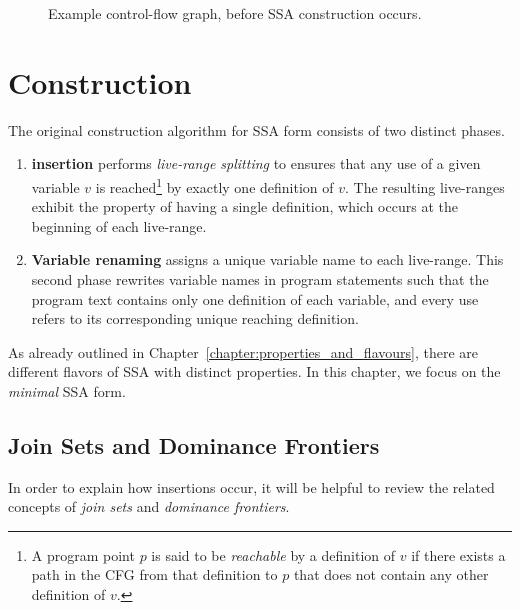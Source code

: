 {\begin{figure}
  \begin{center}
  \end{center}
\caption{\label{fig:classical_construction_algorithm:examplecfg}Example control-flow graph, before
  SSA construction occurs.}
\end{figure}

\section{Construction}
\label{sec:classical_construction}

The original construction algorithm for SSA form consists of two distinct phases.
\begin{enumerate}
\item \textbf{\phifun insertion} performs \textit{live-range splitting} to ensures that any use of a given variable $v$ is reached\footnote{A program point $p$ is said to be \emph{reachable} by a definition of $v$ if there exists a path in the CFG from that definition to $p$ that does not contain any other definition of $v$.} by exactly one definition of $v$. 
  The resulting live-ranges exhibit the property of having a single definition, which occurs at the beginning of each live-range.
\item \textbf{Variable renaming} assigns a unique variable name to each live-range. 
  This second phase rewrites variable names in program statements such that the program text contains only one definition of each variable, and every use refers to its corresponding unique reaching definition.
\end{enumerate}

As already outlined in Chapter~\ref{chapter:properties_and_flavours}, there are different flavors of SSA with distinct properties. 
In this chapter, we focus on the \textit{minimal} SSA form.

\subsection{Join Sets and Dominance Frontiers}
\label{subsec:JS-DF}
In order to explain how \phifun insertions occur, it will be helpful to review the related concepts of \textit{join sets} and \textit{dominance frontiers}.

}
